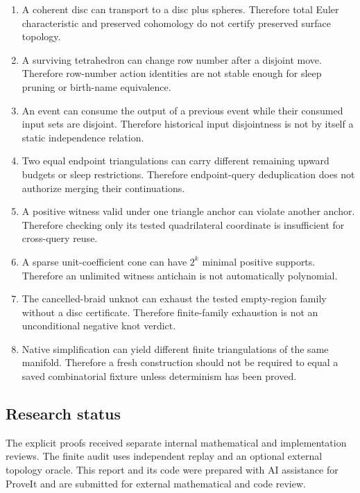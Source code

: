 \begin{enumerate}
\item A coherent disc can transport to a disc plus spheres. Therefore total
Euler characteristic and preserved cohomology do not certify preserved
surface topology.
\item A surviving tetrahedron can change row number after a disjoint move.
Therefore row-number action identities are not stable enough for sleep
pruning or birth-name equivalence.
\item An event can consume the output of a previous event while their
consumed input sets are disjoint. Therefore historical input disjointness
is not by itself a static independence relation.
\item Two equal endpoint triangulations can carry different remaining
upward budgets or sleep restrictions. Therefore endpoint-query deduplication
does not authorize merging their continuations.
\item A positive witness valid under one triangle anchor can violate another
anchor. Therefore checking only its tested quadrilateral coordinate is
insufficient for cross-query reuse.
\item A sparse unit-coefficient cone can have $2^k$ minimal positive supports.
Therefore an unlimited witness antichain is not automatically polynomial.
\item The cancelled-braid unknot can exhaust the tested empty-region family
without a disc certificate. Therefore finite-family exhaustion is not an
unconditional negative knot verdict.
\item Native simplification can yield different finite triangulations of
the same manifold. Therefore a fresh construction should not be required
to equal a saved combinatorial fixture unless determinism has been proved.
\end{enumerate}

\subsection{Research status}

The explicit proofs received separate internal mathematical and implementation
reviews. The finite audit uses independent replay and an optional external
topology oracle. This report and its code were prepared with AI assistance
for ProveIt and are submitted for external mathematical and code review.
